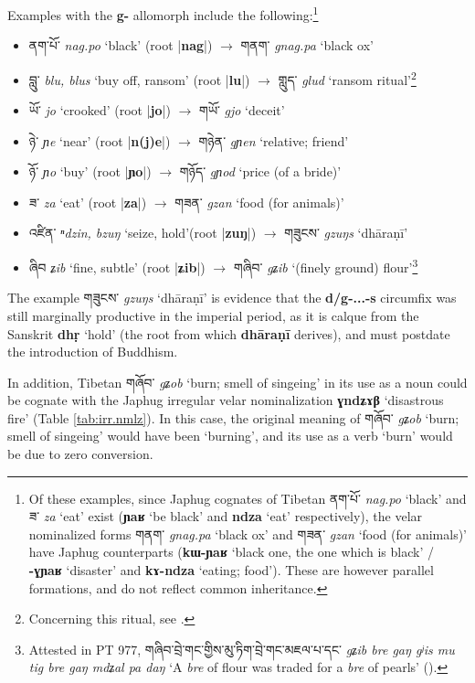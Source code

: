 \documentclass[oneside,a4paper,11pt]{article}
\newcommand{\ipa}[1]{\textbf{{\phon\mbox{#1}}}} %
\newcommand{\tibet}[3]{{\tibetain#1} \textit{\phon#2} `#3'}
\newcommand{\dhat}[1]{|\ipa{#1}|}
\begin{document}
Examples with the \ipa{g-} allomorph include the following:\footnote{Of these examples, since Japhug cognates of Tibetan   \tibet{ནག་པོ་}{nag.po}{black} and   \tibet{ཟ་}{za}{eat} exist (\ipa{ɲaʁ} `be black' and \ipa{ndza} `eat' respectively), the velar nominalized forms  \tibet{གནག་}{gnag.pa}{black ox} 	and  \tibet{གཟན་}{gzan}{food (for animals)} have Japhug counterparts (\ipa{kɯ-ɲaʁ} `black one, the one which is black' / \ipa{-ɣɲaʁ}   `disaster' and \ipa{kɤ-ndza} `eating; food'). These are however parallel formations, and do not reflect common inheritance. }

\begin{itemize}
\item \tibet{ནག་པོ་}{nag.po}{black} (root \dhat{nag}) $\rightarrow$	\tibet{གནག་}{gnag.pa}{black ox} 	
\item \tibet{བླུ་}{blu, blus}{buy off, ransom} (root \dhat{lu}) $\rightarrow$	\tibet{གླུད་}{glud}{ransom ritual}\footnote{Concerning this ritual, see \citet{karmay91glud}.}
\item \tibet{ཡོ་}{jo}{crooked} (root \dhat{jo}) $\rightarrow$	\tibet{གཡོ་}{gjo}{deceit}
\item \tibet{ཉེ་}{ɲe}{near} (root \dhat{n(j)e}) $\rightarrow$	\tibet{གཉེན་}{gɲen}{relative; friend}
\item \tibet{ཉོ་}{ɲo}{buy} (root \dhat{ɲo}) $\rightarrow$ \tibet{གཉོད་}{gɲod}{price (of a bride)}
\item \tibet{ཟ་}{za}{eat} (root \dhat{za}) $\rightarrow$	 \tibet{གཟན་}{gzan}{food (for animals)}
\item \tibet{འཛིན་}{ⁿdzin, bzuŋ}{seize, hold}(root \dhat{zuŋ}) $\rightarrow$	\tibet{གཟུངས་}{gzuŋs}{dhāraṇī}
\item \tibet{ཞིབ}{ʑib}{fine, subtle} (root \dhat{ʑib}) $\rightarrow$	\tibet{གཞིབ་}{gʑib}{(finely ground) flour}\footnote{Attested in PT 977, \tibet{གཞིབ་བྲེ་གང་གྱིས་མུ་ཏིག་བྲེ་གང་མཇལ་པ་དང་}{gʑib bre gaŋ gʲis mu tig bre gaŋ mdʑal pa daŋ}{A \textit{bre} of flour was traded for a \textit{bre} of pearls} (\citealt[430]{silk18pt977}). }
\end{itemize}
 
 The example \tibet{གཟུངས་}{gzuŋs}{dhāraṇī} is evidence that the \ipa{d/g-...-s} circumfix was still marginally productive in the imperial period, as it is calque from the Sanskrit \ipa{dhṛ} `hold' (the root from which \ipa{dhāraṇī} derives),  and must postdate the introduction of Buddhism.
 
In addition, Tibetan \tibet{གཞོབ་}{gʑob}{burn; smell of singeing} in its use as a noun could be cognate with the Japhug irregular velar nominalization \ipa{ɣndʑɤβ}  `disastrous fire' (Table \ref{tab:irr.nmlz}). In this case, the original meaning of \tibet{གཞོབ་}{gʑob}{burn; smell of singeing} would have been `burning', and its use as a verb `burn' would be due to zero conversion.
\end{document}
